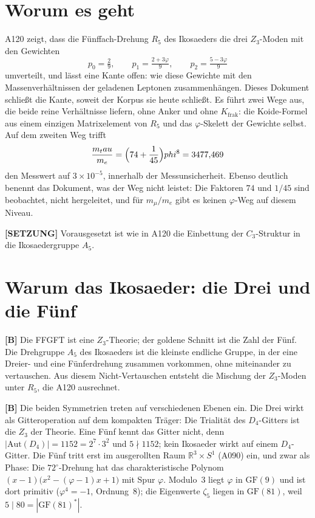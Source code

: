 \section{Worum es geht}

A120 zeigt, dass die Fünffach-Drehung $R_5$ des Ikosaeders die drei
$Z_3$-Moden mit den Gewichten
\[
  p_0 = \tfrac29,\qquad p_1 = \tfrac{2+3\varphi}{9},\qquad p_2 = \tfrac{5-3\varphi}{9}
\]
umverteilt, und lässt eine Kante offen: wie diese Gewichte mit den
Massenverhältnissen der geladenen Leptonen zusammenhängen. Dieses Dokument
schließt die Kante, soweit der Korpus sie heute schließt. Es führt zwei Wege
aus, die beide reine Verhältnisse liefern, ohne Anker und ohne
$K_\text{frak}$: die Koide-Formel aus einem einzigen Matrixelement von $R_5$
und das $\varphi$-Skelett der Gewichte selbst. Auf dem zweiten Weg trifft
\[
  \frac{m_\tau}{m_e} = \Bigl(74+\frac1{45}\Bigr)\varphi^8 = 3477{,}469
\]
den Messwert auf $3\times10^{-5}$, innerhalb der Messunsicherheit. Ebenso
deutlich benennt das Dokument, was der Weg nicht leistet: Die Faktoren $74$
und $1/45$ sind beobachtet, nicht hergeleitet, und für $m_\mu/m_e$ gibt es
keinen $\varphi$-Weg auf diesem Niveau.

\textbf{[SETZUNG]} Vorausgesetzt ist wie in A120 die Einbettung der
$C_3$-Struktur in die Ikosaedergruppe $A_5$.

\section{Warum das Ikosaeder: die Drei und die Fünf}

\textbf{[B]} Die FFGFT ist eine $Z_3$-Theorie; der goldene Schnitt ist die
Zahl der Fünf. Die Drehgruppe $A_5$ des Ikosaeders ist die kleinste endliche
Gruppe, in der eine Dreier- und eine Fünferdrehung zusammen vorkommen, ohne
miteinander zu vertauschen. Aus diesem Nicht-Vertauschen entsteht die Mischung
der $Z_3$-Moden unter $R_5$, die A120 ausrechnet.

\textbf{[B]} Die beiden Symmetrien treten auf verschiedenen Ebenen ein. Die Drei
wirkt als Gitteroperation auf dem kompakten Träger: Die Trialität des
$D_4$-Gitters ist die $Z_3$ der Theorie. Eine Fünf kennt das Gitter nicht,
denn $|\mathrm{Aut}(D_4)| = 1152 = 2^7\cdot3^2$ und $5\nmid1152$; kein
Ikosaeder wirkt auf einem $D_4$-Gitter. Die Fünf tritt erst im ausgerollten
Raum $\mathbb{R}^3\times S^1$ (A090) ein, und zwar als Phase: Die
$72^\circ$-Drehung hat das charakteristische Polynom
$(x-1)\bigl(x^2-(\varphi-1)x+1\bigr)$ mit Spur $\varphi$. Modulo~3 liegt
$\varphi$ in $\mathrm{GF}(9)$ und ist dort primitiv ($\varphi^4=-1$,
Ordnung~8); die Eigenwerte $\zeta_5$ liegen in $\mathrm{GF}(81)$, weil
$5\mid80=|\mathrm{GF}(81)^*|$.

